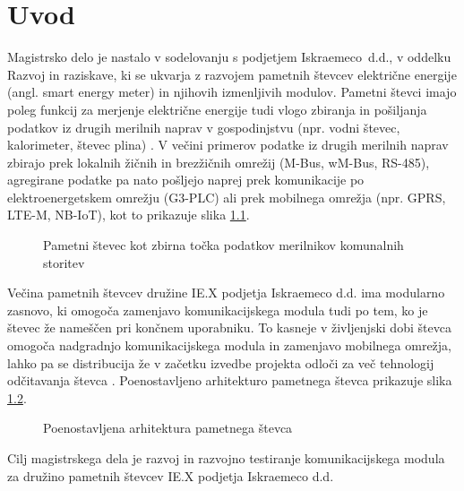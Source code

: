 \documentclass[a4paper,twoside,openright,12pt,slovene]{book}
\begin{document}
\mainmatter

\chapter{Uvod} \label{uvod}

Magistrsko delo je nastalo v sodelovanju s podjetjem Iskraemeco~d.d., v oddelku
Razvoj in raziskave, ki se ukvarja z razvojem pametnih števcev električne energije
(angl. smart energy meter) in njihovih izmenljivih modulov.
Pametni števci imajo poleg funkcij za merjenje električne energije tudi vlogo zbiranja in pošiljanja podatkov iz drugih merilnih naprav v gospodinjstvu (npr. vodni števec, kalorimeter, števec plina) \cite{skalar_zasnova_nodate}. V večini primerov podatke iz drugih merilnih naprav zbirajo prek lokalnih žičnih in brezžičnih omrežij (M-Bus, wM-Bus, RS-485), agregirane podatke pa nato pošljejo naprej prek komunikacije po elektroenergetskem omrežju (G3-PLC) ali prek mobilnega omrežja (npr. GPRS, LTE-M, NB-IoT), kot to prikazuje slika \ref{fig:AMI arhitektura}. 

\begin{figure}[h]
    \centering
    
    \caption{\label{fig:AMI arhitektura} Pametni števec kot zbirna točka podatkov merilnikov komunalnih storitev}
\end{figure}
\newpage
Večina pametnih števcev družine IE.X podjetja Iskraemeco d.d. ima modularno zasnovo, ki omogoča zamenjavo komunikacijskega modula tudi po tem, ko je števec že nameščen pri končnem uporabniku. To kasneje v življenjski dobi števca omogoča nadgradnjo komunikacijskega modula in zamenjavo mobilnega omrežja, lahko pa se distribucija že v začetku izvedbe projekta odloči za več tehnologij odčitavanja števca \cite{Croatia}. Poenostavljeno arhitekturo pametnega števca prikazuje slika \ref{blok_shema_stevec}.

\begin{figure}[h]
    \centering
    
    \caption{\label{blok_shema_stevec} Poenostavljena arhitektura pametnega števca}
\end{figure}
\par Cilj magistrskega dela je razvoj in razvojno testiranje komunikacijskega modula za družino pametnih števcev IE.X podjetja Iskraemeco d.d.
\end{document}
